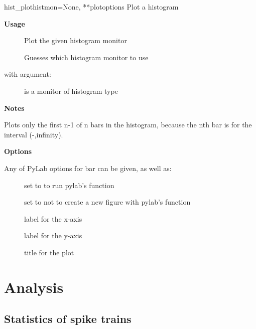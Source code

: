 \documentclass[letterpaper,10pt,english]{manual}
\begin{document}
\hypertarget{brian.hist_plot}{}\begin{funcdesc}{hist\_plot}{histmon=None, **plotoptions}
Plot a histogram

\textbf{Usage}
\begin{description}
\item[]
Plot the given histogram monitor

\item[]
Guesses which histogram monitor to use

\end{description}

with argument:
\begin{description}
\item[]
is a monitor of histogram type

\end{description}

\textbf{Notes}

Plots only the first n-1 of n bars in the histogram, because
the nth bar is for the interval (-,infinity).

\textbf{Options}

Any of PyLab options for bar can be given, as well as:
\begin{description}
\item[]
set to  to run pylab's  function

\item[]
set to  not to create a new figure with pylab's  function

\item[]
label for the x-axis

\item[]
label for the y-axis

\item[]
title for the plot

\end{description}
\end{funcdesc}

\resetcurrentobjects


\section{Analysis}


\subsection{Statistics of spike trains}
\end{document}
